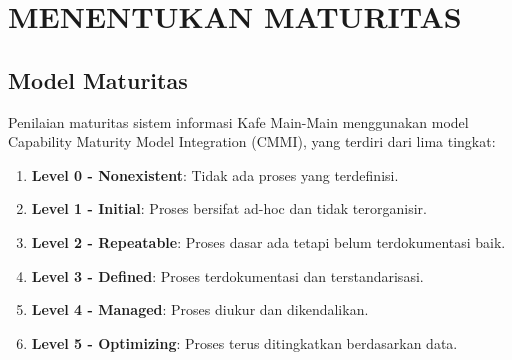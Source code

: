 \documentclass[12pt, a4paper]{report}
\begin{document}



\chapter{MENENTUKAN MATURITAS}
\label{bab:maturitas}

\section{Model Maturitas}
Penilaian maturitas sistem informasi Kafe Main-Main menggunakan model Capability Maturity Model Integration (CMMI), yang terdiri dari lima tingkat:
\begin{enumerate}
    \item \textbf{Level 0 - Nonexistent}: Tidak ada proses yang terdefinisi.
    \item \textbf{Level 1 - Initial}: Proses bersifat ad-hoc dan tidak terorganisir.
    \item \textbf{Level 2 - Repeatable}: Proses dasar ada tetapi belum terdokumentasi baik.
    \item \textbf{Level 3 - Defined}: Proses terdokumentasi dan terstandarisasi.
    \item \textbf{Level 4 - Managed}: Proses diukur dan dikendalikan.
    \item \textbf{Level 5 - Optimizing}: Proses terus ditingkatkan berdasarkan data.
\end{enumerate}
\end{document}

